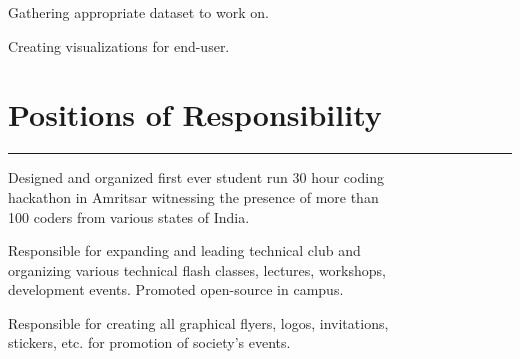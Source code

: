 \documentclass[]{puneet-resume}
\begin{document}
\begin{minipage}[t]{0.66\textwidth}
 
\noindent
\hspace{5em}%
\begin{tightemize}
\begin{minipage}{0.85\textwidth\vspace{2pt}}
	\item Gathering appropriate dataset to work on.
	\item Creating visualizations for end-user.
\end{minipage}
\end{tightemize}
\sectionsep
\section{Positions of Responsibility} 
\noindent\rule{12.5cm}{0.4pt}
 
\noindent
\hspace{5em}%
\begin{minipage}{0.85\textwidth\vspace{2pt}}
Designed and organized first ever student run 30 hour coding\\
hackathon in Amritsar witnessing the presence of more than\\
100 coders from various states of India.
\end{minipage}
 
\noindent
\hspace{5em}%
\begin{minipage}{0.85\textwidth\vspace{2pt}}
Responsible for expanding and leading technical club and\\
organizing various technical flash classes, lectures, workshops,\\
development events. Promoted open-source in campus.
\end{minipage}
 
\noindent
\hspace{5em}%
\begin{minipage}{0.85\textwidth\vspace{2pt}}
Responsible for creating all graphical flyers, logos, invitations,\\
stickers, etc. for promotion of society's events.
\end{minipage}

\end{minipage}
\end{document}
